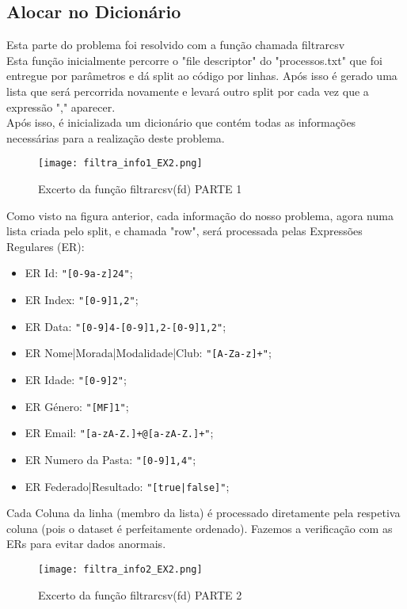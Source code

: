 \documentclass[11pt,a4paper]{report}%
\begin{document}
  
  
\subsection{Alocar no Dicionário} \label{subsec:parser2}
Esta parte do problema foi resolvido com a função chamada filtrar\textunderscore csv\\
Esta função inicialmente percorre o "file descriptor" do "processos.txt" que foi entregue por parâmetros e dá split ao código por linhas. Após isso é gerado uma lista que será percorrida novamente e levará outro split por cada vez que a expressão "," aparecer.\\
Após isso, é inicializada um dicionário que contém todas as informações necessárias para a realização deste problema.

\begin{figure}[htbp]
\centerline{\texttt{[image: filtra\_info1\_EX2.png]}}
\caption{Excerto da função filtrar\textunderscore csv(fd) PARTE 1}
\label{fig}
\end{figure}  

Como visto na figura anterior, cada informação do nosso problema, agora numa lista criada pelo split, e chamada "row", será processada pelas Expressões Regulares (ER):


\begin{itemize}
  \item ER Id: \texttt{"[0-9a-z]{24}"};
  \item ER Index: \texttt{"[0-9]{1,2}"};
  \item ER Data: \texttt{"[0-9]{4}-[0-9]{1,2}-[0-9]{1,2}"};
  \item ER Nome|Morada|Modalidade|Club: \texttt{"[A-Za-z]+"};
  \item ER Idade: \texttt{"[0-9]{2}"};
  \item ER Género: \texttt{"[MF]{1}"};
  \item ER Email: \texttt{"[a-zA-Z.]+@[a-zA-Z.]+"};
  \item ER Numero da Pasta: \texttt{"[0-9]{1,4}"};
  \item ER Federado|Resultado: \texttt{"[true|false]"};
\end{itemize}

Cada Coluna da linha (membro da lista) é processado diretamente pela respetiva coluna (pois o dataset é perfeitamente ordenado).
Fazemos a verificação com as ERs para evitar dados anormais.

\begin{figure}[htbp]
\centerline{\texttt{[image: filtra\_info2\_EX2.png]}}
\caption{Excerto da função filtrar\textunderscore csv(fd) PARTE 2}
\label{fig}
\end{figure} 
\end{document}
